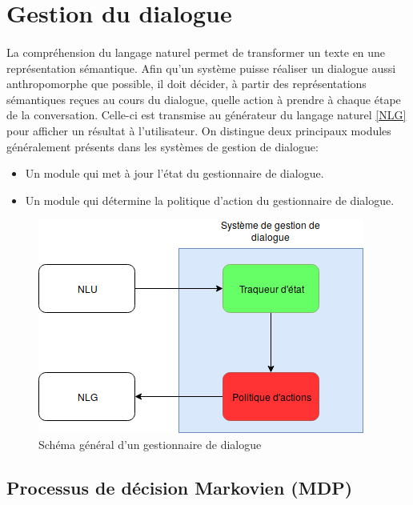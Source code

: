 \section{Gestion du dialogue}
	\paragraph{}
	La compréhension du langage naturel permet de transformer un texte en une représentation sémantique. Afin qu’un système puisse réaliser un dialogue aussi anthropomorphe que possible, il doit décider, à partir des représentations sémantiques reçues au cours du dialogue, quelle action à prendre à chaque étape de la conversation. Celle-ci est transmise au générateur du langage naturel \ref{NLG} pour afficher un résultat à l’utilisateur. On distingue deux principaux modules généralement présents dans les systèmes de gestion de dialogue:
\begin{itemize}
	\item Un module qui met à jour l’état du gestionnaire de dialogue.
	\item Un module qui détermine la politique d’action du gestionnaire de dialogue.
\end{itemize}

\begin{figure}[H]
	\centering
	\includegraphics[width=.7\linewidth]{images/DM/DMGeneral.png} 
	\caption{Schéma général d'un gestionnaire de dialogue} 
\end{figure}


	\subsection{Processus de décision Markovien (MDP)}\label{MDP}
